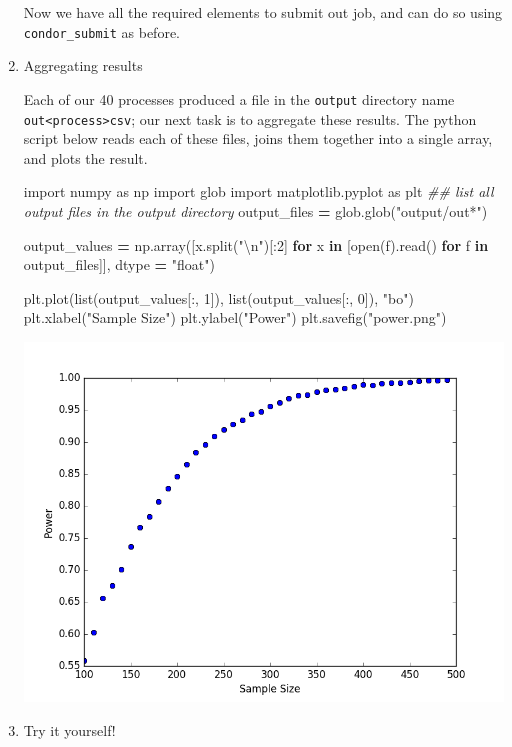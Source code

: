 \documentclass[
]{book}
\newenvironment{Shaded}{\begin{snugshade}}{\end{snugshade}}
\newcommand{\BuiltInTok}[1]{#1}
\newcommand{\CharTok}[1]{\textcolor[rgb]{0.31,0.60,0.02}{#1}}
\newcommand{\CommentTok}[1]{\textcolor[rgb]{0.56,0.35,0.01}{\textit{#1}}}
\newcommand{\ControlFlowTok}[1]{\textcolor[rgb]{0.13,0.29,0.53}{\textbf{#1}}}
\newcommand{\DecValTok}[1]{\textcolor[rgb]{0.00,0.00,0.81}{#1}}
\newcommand{\ImportTok}[1]{#1}
\newcommand{\KeywordTok}[1]{\textcolor[rgb]{0.13,0.29,0.53}{\textbf{#1}}}
\newcommand{\NormalTok}[1]{#1}
\newcommand{\OperatorTok}[1]{\textcolor[rgb]{0.81,0.36,0.00}{\textbf{#1}}}
\newcommand{\StringTok}[1]{\textcolor[rgb]{0.31,0.60,0.02}{#1}}
\begin{document}
\begin{enumerate}
  Now we have all the required elements to submit out job, and can do
  so using \texttt{condor\_submit} as before.
\item
  Aggregating results

  Each of our 40 processes produced a file in the \texttt{output} directory
  name \texttt{out\textless{}process\textgreater{}csv}; our next task is to aggregate these results.
  The python script below reads each of these files, joins them
  together into a single array, and plots the result.

\begin{Shaded}
\begin{Highlighting}[]
\ImportTok{import}\NormalTok{ numpy }\ImportTok{as}\NormalTok{ np}
\ImportTok{import}\NormalTok{ glob}
\ImportTok{import}\NormalTok{ matplotlib.pyplot }\ImportTok{as}\NormalTok{ plt}
\CommentTok{\#\# list all output files in the output directory}
\NormalTok{output\_files }\OperatorTok{=}\NormalTok{ glob.glob(}\StringTok{"output/out*"}\NormalTok{)}

\NormalTok{output\_values }\OperatorTok{=}\NormalTok{ np.array([x.split(}\StringTok{"}\CharTok{\textbackslash{}n}\StringTok{"}\NormalTok{)[:}\DecValTok{2}\NormalTok{]}
                          \ControlFlowTok{for}\NormalTok{ x }\KeywordTok{in}\NormalTok{ [}\BuiltInTok{open}\NormalTok{(f).read() }\ControlFlowTok{for}\NormalTok{ f }\KeywordTok{in}\NormalTok{ output\_files]],}
\NormalTok{                         dtype }\OperatorTok{=} \StringTok{"float"}\NormalTok{)}

\NormalTok{plt.plot(}\BuiltInTok{list}\NormalTok{(output\_values[:, }\DecValTok{1}\NormalTok{]), }\BuiltInTok{list}\NormalTok{(output\_values[:, }\DecValTok{0}\NormalTok{]), }\StringTok{"bo"}\NormalTok{)}
\NormalTok{plt.xlabel(}\StringTok{"Sample Size"}\NormalTok{)}
\NormalTok{plt.ylabel(}\StringTok{"Power"}\NormalTok{)}
\NormalTok{plt.savefig(}\StringTok{"power.png"}\NormalTok{)}
\end{Highlighting}
\end{Shaded}

  \includegraphics{images/python_powerDist.png}
\item
  Try it yourself!


\end{enumerate}
\end{document}
